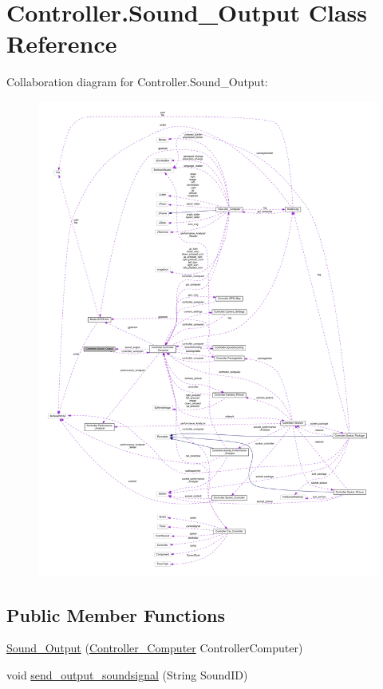 \hypertarget{class_controller_1_1_sound___output}{}\section{Controller.\+Sound\+\_\+\+Output Class Reference}
\label{class_controller_1_1_sound___output}


Collaboration diagram for Controller.\+Sound\+\_\+\+Output\+:
\nopagebreak
\begin{figure}[H]
\begin{center}
\leavevmode
\includegraphics[width=350pt]{class_controller_1_1_sound___output__coll__graph}
\end{center}
\end{figure}
\subsection*{Public Member Functions}
\begin{DoxyCompactItemize}
\item 
\hyperlink{class_controller_1_1_sound___output_a4f4bc4764df4d8b79f502d3db57c72b4}{Sound\+\_\+\+Output} (\hyperlink{class_controller_1_1_controller___computer}{Controller\+\_\+\+Computer} Controller\+Computer)
\item 
void \hyperlink{class_controller_1_1_sound___output_a614fad3661aebdc0dc122b4dfdbd02b0}{send\+\_\+output\+\_\+soundsignal} (String Sound\+I\+D)
\end{DoxyCompactItemize}


